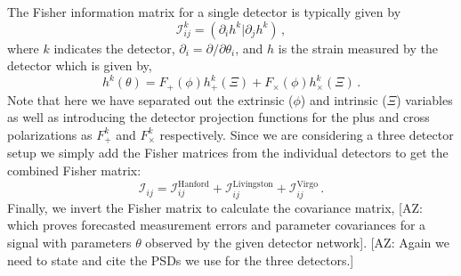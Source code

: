 \documentclass[twocolumn]{aastex631}
\newcommand{\AZ}[1]{{\color{Burnt}[AZ: #1]}}
\begin{document}
The Fisher information matrix for a single detector is typically given by 
\begin{equation}
    \label{eq:fisher}
    \mathcal{I}^{k}_{ij} = (\partial_i h^k | \partial_j h^k) \, ,
\end{equation}
where $k$ indicates the detector, $\partial_i = \partial/\partial \theta_i$, and $h$ is the strain measured by the detector which is given by,
\begin{equation}
    h^k(\theta) = F_+(\phi) h^k_{+}(\Xi) + F_\times(\phi) h^k_{\times}(\Xi) \, .
\end{equation}
Note that here we have separated out the extrinsic ($\phi$) and intrinsic ($\Xi$) variables as well as introducing the detector projection functions for the plus and cross polarizations as $F^k_+$ and $F^k_\times$ respectively.
Since we are considering a three detector setup we simply add the Fisher matrices from the individual detectors to get the combined Fisher matrix:
\begin{equation}
    \mathcal{I}_{ij} =  \mathcal{I}^{\mathrm{Hanford}}_{ij} + \mathcal{I}^{\mathrm{Livingston}}_{ij} + \mathcal{I}^{\mathrm{Virgo}}_{ij}   \, .
\end{equation}
Finally, we invert the Fisher matrix to calculate the covariance matrix,
\AZ{which proves forecasted measurement errors and parameter covariances for a signal with parameters $\theta$ observed by the given detector network}.
\AZ{Again we need to state and cite the PSDs we use for the three detectors.}

\end{document}

